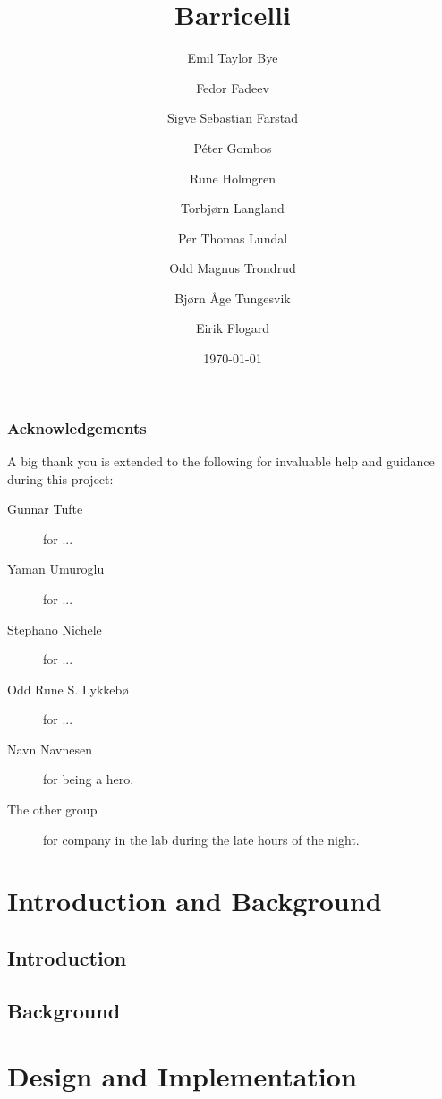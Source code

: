 \documentclass{report}
\title{Barricelli}
\date{\today}
\author{Emil Taylor Bye
     \and Fedor Fadeev
     \and Sigve Sebastian Farstad
     \and Péter Gombos
     \and Rune Holmgren
     \and Torbjørn Langland
     \and Per Thomas Lundal
     \and Odd Magnus Trondrud
     \and Bjørn Åge Tungesvik
     \and Eirik Flogard
}
\begin{document}


\maketitle

\begin{abstract}
	
\end{abstract}

\thispagestyle{empty}
\section*{Acknowledgements}
A big thank you is extended to the following for invaluable help and guidance during this project:

\begin{description}
\item[Gunnar Tufte] for ...
\item[Yaman Umuroglu] for ...
\item[Stephano Nichele] for ...
\item[Odd Rune S. Lykkebø] for ...
\item[Navn Navnesen] for being a hero.
\item[The other group] for company in the lab during the late hours of the night.
\end{description}

\tableofcontents
\newpage

\listoffigures
\listoftables
\listofalgorithms
\renewcommand{\lstlistlistingname}{List of Listings}
\lstlistoflistings

\setcounter{page}{1}

\part{Introduction and Background}

\chapter{Introduction}
	

\chapter{Background}
	

\part{Design and Implementation}
\end{document}
